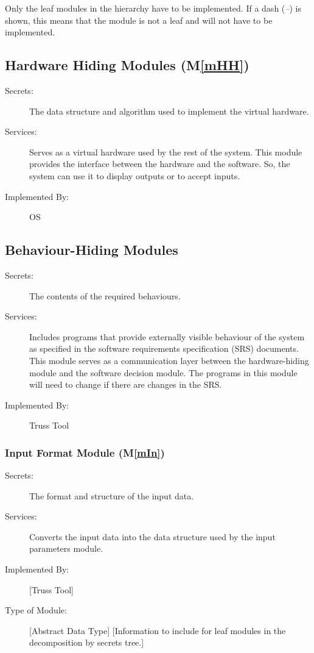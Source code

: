 \documentclass[12pt, titlepage]{article}
\newcommand{\mref}[1]{M\ref{#1}}
\begin{document}
Only the leaf modules in the hierarchy have to be implemented. If a dash
(\emph{--}) is shown, this means that the module is not a leaf and will not have
to be implemented.

\subsection{Hardware Hiding Modules (\mref{mHH})}

\begin{description}
\item[Secrets:]The data structure and algorithm used to implement the virtual
  hardware.
\item[Services:]Serves as a virtual hardware used by the rest of the
  system. This module provides the interface between the hardware and the
  software. So, the system can use it to display outputs or to accept inputs.
\item[Implemented By:] OS
\end{description}

\subsection{Behaviour-Hiding Modules}

\begin{description}
\item[Secrets:]The contents of the required behaviours.
\item[Services:]Includes programs that provide externally visible behaviour of
  the system as specified in the software requirements specification (SRS)
  documents. This module serves as a communication layer between the
  hardware-hiding module and the software decision module. The programs in this
  module will need to change if there are changes in the SRS.
\item[Implemented By:] Truss Tool
\end{description}

\subsubsection{Input Format Module (\mref{mIn})}

\begin{description}
\item[Secrets:]The format and structure of the input data.
\item[Services:]Converts the input data into the data structure used by the
  input parameters module.
\item[Implemented By:] [Truss Tool]
\item[Type of Module:] [Abstract Data Type]
  [Information to include for leaf modules in the decomposition by secrets tree.]
\end{description}
\end{document}
